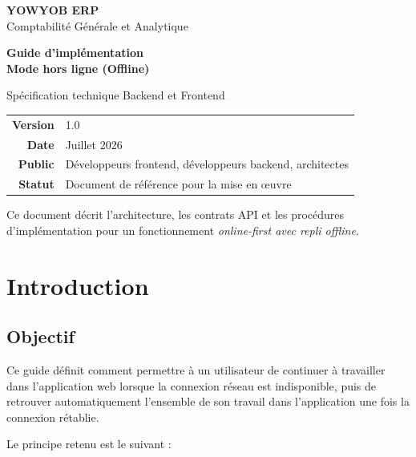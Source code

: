 \documentclass[12pt,a4paper]{report}
\begin{document}
\begin{titlepage}
  \centering
  \vspace*{2cm}
  {\LARGE\textbf{YOWYOB ERP}\\[0.4em]Comptabilité Générale et Analytique\par}
  \vspace{1.8cm}
  {\Huge\textbf{Guide d'implémentation\\[0.35em]Mode hors ligne (Offline)}\par}
  \vspace{1.2cm}
  {\large Spécification technique Backend et Frontend\par}
  \vspace{2.2cm}
  \begin{tabular}{rl}
    \textbf{Version} & 1.0 \\
    \textbf{Date} & Juillet 2026 \\
    \textbf{Public} & Développeurs frontend, développeurs backend, architectes \\
    \textbf{Statut} & Document de référence pour la mise en œuvre \\
  \end{tabular}
  \vfill
  {\small Ce document décrit l'architecture, les contrats API et les procédures d'implémentation pour un fonctionnement \emph{online-first avec repli offline}.\par}
\end{titlepage}

\tableofcontents
\newpage

\chapter{Introduction}

\section{Objectif}

Ce guide définit comment permettre à un utilisateur de continuer à travailler dans l'application web lorsque la connexion réseau est indisponible, puis de retrouver automatiquement l'ensemble de son travail dans l'application une fois la connexion rétablie.

Le principe retenu est le suivant :
\end{document}
